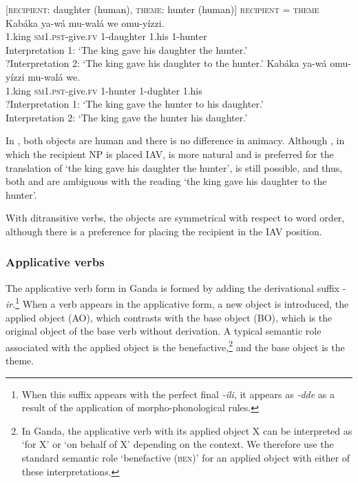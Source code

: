 \documentclass[output=paper,
            colorlinks, citecolor=brown
            ,draftmode
		  ]{langscibook}
\begin{document}
\ea%
    \label{ex:yoneda:11}
    [\textsc{recipient}: daughter (human), \textsc{theme}: hunter (human)]    \textsc{recipient} = \textsc{theme}
    \ea\label{ex:yoneda:11a}\gll  Kabáka   ya-wá             mu-walá     we     omu-yízzi. \\
         1.king    \textsc{sm1.pst}-give.\textsc{fv}    1-daughter    1.his  1-hunter\\
    \glt Interpretation 1:  ‘The king gave his daughter the hunter.’\\
       ?Interpretation 2:  ‘The king gave his daughter to the hunter.’
    \ex\label{ex:yoneda:11b} \gll Kabáka   ya-wá             omu-yízzi  mu-walá    we.\\
    1.king    \textsc{sm1.pst}-give.\textsc{fv}     1-hunter    1-dughter  1.his\\
    \glt ?Interpretation 1:  ‘The king gave the hunter to his daughter.’\\
         Interpretation 2:  ‘The king gave the hunter his daughter.’
    \z
\z  

            

In , both objects are human and there is no difference in animacy. Although , in which the recipient NP is placed IAV, is more natural and is preferred for the translation of ‘the king gave his daughter the hunter’,  is still possible, and thus, both  and  are ambiguous with the reading ‘the king gave his daughter to the hunter’.

With ditransitive verbs, the objects are symmetrical with respect to word order, although there is a preference for placing the recipient in the IAV position. 


\subsubsection{Applicative verbs}\label{sec:yoneda:3.1.2}



The applicative verb form in Ganda is formed by adding the derivational suffix -\textit{ir}.\footnote{When this suffix appears with the perfect final \textit{{}-ili}, it appears as \textit{{}-dde} as a result of the application of morpho-phonological rules.}  When a verb appears in the applicative form, a new object is introduced, the applied object (AO), which contrasts with the base object (BO), which is the original object of the base verb without derivation. A typical semantic role associated with the applied object is the benefactive,\footnote{In Ganda, the applicative verb with its applied object X can be interpreted as `for X' or `on behalf of X' depending on the context. We therefore use the standard semantic role `benefactive (\textsc{ben})' for an applied object with either of these interpretations.} and the base object is the theme.
\end{document}
